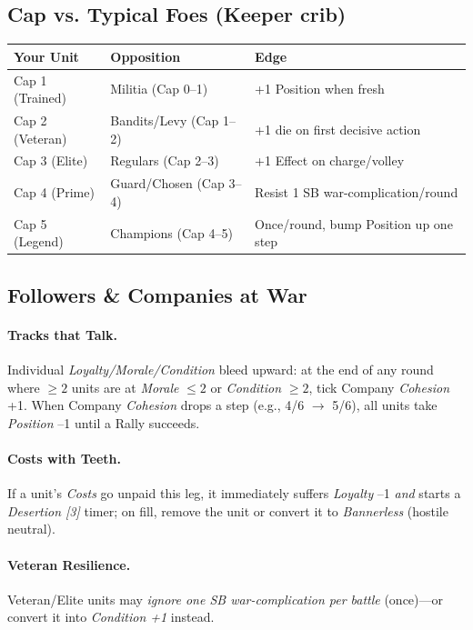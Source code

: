\documentclass[11pt]{article}
\begin{document}
\subsection{Cap vs. Typical Foes (Keeper crib)}
\begin{center}\small
\begin{longtable}{lll}
\toprule
\textbf{Your Unit} & \textbf{Opposition} & \textbf{Edge} \\
\midrule
Cap 1 (Trained) & Militia (Cap 0--1) & +1 Position when fresh \\
Cap 2 (Veteran) & Bandits/Levy (Cap 1--2) & +1 die on first decisive action \\
Cap 3 (Elite) & Regulars (Cap 2--3) & +1 Effect on charge/volley \\
Cap 4 (Prime) & Guard/Chosen (Cap 3--4) & Resist 1 SB war-complication/round \\
Cap 5 (Legend) & Champions (Cap 4--5) & Once/round, bump Position up one step \\
\bottomrule
\end{longtable}
\end{center}

\subsection{Followers \& Companies at War}
\paragraph{Tracks that Talk.} Individual \emph{Loyalty/Morale/Condition} bleed upward: at the end of any round where $\ge 2$ units are at \emph{Morale} $\le 2$ or \emph{Condition} $\ge 2$, tick Company \emph{Cohesion} +1. When Company \emph{Cohesion} drops a step (e.g., 4/6 $\rightarrow$ 5/6), all units take \emph{Position} --1 until a Rally succeeds. %
\paragraph{Costs with Teeth.} If a unit's \emph{Costs} go unpaid this leg, it immediately suffers \emph{Loyalty} --1 \emph{and} starts a \emph{Desertion [3]} timer; on fill, remove the unit or convert it to \emph{Bannerless} (hostile neutral).
\paragraph{Veteran Resilience.} Veteran/Elite units may \emph{ignore one SB war-complication per battle} (once)---or convert it into \emph{Condition +1} instead.
\end{document}
